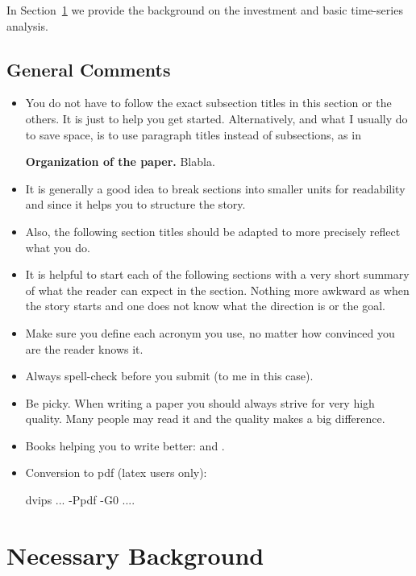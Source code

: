 \documentclass{article}
\begin{document}
In Section~\ref{sec:background} we provide the background on the investment and basic time-series analysis.

\subsection{General Comments}

\begin{itemize}
\item You do not have to follow the exact subsection titles in this section
or the others. It is just to help you get started.  Alternatively, and
what I usually do to save space, is to use paragraph titles instead of
subsections, as in

{\bf Organization of the paper.} Blabla.

\item It is generally a good idea to break sections into smaller units for
readability and since it helps you to structure the story.

\item Also, the following section titles should be adapted to more precisely
reflect what you do.

\item It is helpful to start each of the following sections with a very
short summary of what the reader can expect in the section. Nothing
more awkward as when the story starts and one does not know what the
direction is or the goal.

\item Make sure you define each acronym you use, no matter how convinced you are
the reader knows it.

\item Always spell-check before you submit (to me in this case).

\item Be picky. When writing a paper you should always strive for very
high quality. Many people may read it and the quality makes a big difference.

\item Books helping you to write better: \cite{Higham:98} and \cite{Strunk:00}.

\item Conversion to pdf (latex users only): 

dvips ... -Ppdf -G0 ....
\end{itemize}


\section{Necessary Background}
\label{sec:background}
\end{document}
